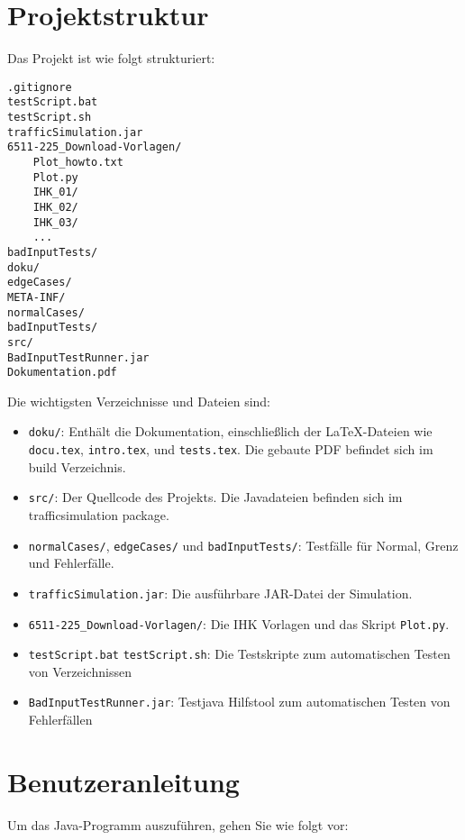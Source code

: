 \documentclass[a4paper,12pt]{report}
\begin{document}
\chapter{Projektstruktur}

Das Projekt ist wie folgt strukturiert:

\begin{verbatim}
.gitignore
testScript.bat
testScript.sh
trafficSimulation.jar
6511-225_Download-Vorlagen/
    Plot_howto.txt
    Plot.py
    IHK_01/
    IHK_02/
    IHK_03/
    ...
badInputTests/
doku/
edgeCases/
META-INF/
normalCases/
badInputTests/
src/
BadInputTestRunner.jar
Dokumentation.pdf
\end{verbatim}

Die wichtigsten Verzeichnisse und Dateien sind:
\begin{itemize}
    \item \texttt{doku/}: Enthält die Dokumentation, einschließlich der LaTeX-Dateien wie \texttt{docu.tex}, \texttt{intro.tex}, und \texttt{tests.tex}. Die gebaute PDF befindet sich im build Verzeichnis.
    \item \texttt{src/}: Der Quellcode des Projekts. Die Javadateien befinden sich im trafficsimulation package.
    \item \texttt{normalCases/}, \texttt{edgeCases/} und \texttt{badInputTests/}: Testfälle für Normal, Grenz und Fehlerfälle.
    \item \texttt{trafficSimulation.jar}: Die ausführbare JAR-Datei der Simulation.
    \item \texttt{6511-225\_Download-Vorlagen/}: Die IHK Vorlagen und das Skript \texttt{Plot.py}.
    \item \texttt{testScript.bat} \texttt{testScript.sh}: Die Testskripte zum automatischen Testen von Verzeichnissen
    \item \texttt{BadInputTestRunner.jar}: Testjava Hilfstool zum automatischen Testen von Fehlerfällen
\end{itemize}

\chapter{Benutzeranleitung}

Um das Java-Programm auszuführen, gehen Sie wie folgt vor:
\end{document}
